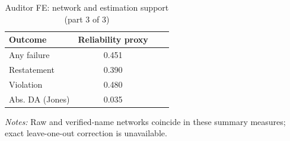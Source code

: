 \begin{table}[htbp]
\footnotesize
\centering
\caption{Auditor FE: network and estimation support (part 3 of 3)}
\begin{threeparttable}
\begin{tabular}{p{}ccc}
\toprule
Outcome & Reliability proxy &  &  \\
\midrule
Any failure & 0.451 &  &  \\
Restatement & 0.390 &  &  \\
Violation & 0.480 &  &  \\
Abs. DA (Jones) & 0.035 &  &  \\
\bottomrule
\end{tabular}
\begin{tablenotes}\footnotesize
\item \raggedright \textit{Notes:} Raw and verified-name networks coincide in these summary measures; exact leave-one-out correction is unavailable.
\end{tablenotes}
\end{threeparttable}
\end{table}
